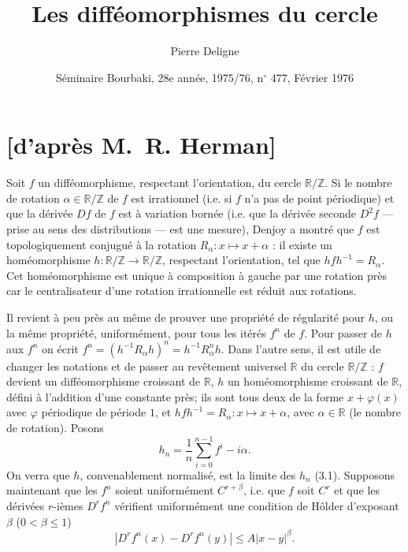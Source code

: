 \documentclass[12pt]{amsart}
\title{Les diff\'{e}omorphismes du cercle}
\author{Pierre Deligne}
\date{S\'{e}minaire Bourbaki, 28e ann\'{e}e, 1975/76, n$^{\circ}$ 477, F\'{e}vrier 1976}
\theoremstyle{plain}
\theoremstyle{remark}
\begin{document}
\maketitle

\section*{[d'apr\`{e}s M.~R. Herman]}

Soit $f$ un diff\'{e}omorphisme, respectant l'orientation, du cercle $\mathbb{R}/\mathbb{Z}$.
Si le nombre de rotation $\alpha \in \mathbb{R}/\mathbb{Z}$ de $f$ est irrationnel (i.e. si $f$ n'a pas de point p\'{e}riodique) et que la d\'{e}riv\'{e}e $Df$ de $f$ est \`{a} variation born\'{e}e (i.e. que la d\'{e}riv\'{e}e seconde $D^{2}f$ --- prise au sens des distributions --- est une mesure), Denjoy a montr\'{e} que $f$ est topologiquement conjugu\'{e} \`{a} la rotation $R_{\alpha} : x \mapsto x + \alpha$ : il existe un hom\'{e}omorphisme $h : \mathbb{R}/\mathbb{Z} \to \mathbb{R}/\mathbb{Z}$, respectant l'orientation, tel que $hfh^{-1} = R_{\alpha}$. Cet hom\'{e}omorphisme est unique \`{a} composition \`{a} gauche par une rotation pr\`{e}s car le centralisateur d'une rotation irrationnelle est r\'{e}duit aux rotations.

Il revient \`{a} peu pr\`{e}s au m\^{e}me de prouver une propri\'{e}t\'{e} de r\'{e}gularit\'{e} pour $h$, ou la m\^{e}me propri\'{e}t\'{e}, uniform\'{e}ment, pour tous les it\'{e}r\'{e}s $f^{n}$ de $f$. Pour passer de $h$ aux $f^{n}$ on \'{e}crit $f^{n} = (h^{-1}R_{\alpha}h)^{n} = h^{-1}R_{\alpha}^{n}h$. Dans l'autre sens, il est utile de changer les notations et de passer au rev\^{e}tement universel $\mathbb{R}$ du cercle $\mathbb{R}/\mathbb{Z}$ : $f$ devient un diff\'{e}omorphisme croissant de $\mathbb{R}$, $h$ un hom\'{e}omorphisme croissant de $\mathbb{R}$, d\'{e}fini \`{a} l'addition d'une constante pr\`{e}s; ils sont tous deux de la forme $x + \varphi(x)$ avec $\varphi$ p\'{e}riodique de p\'{e}riode $1$, et $hfh^{-1} = R_{\alpha} : x \mapsto x + \alpha$, avec $\alpha \in \mathbb{R}$ (le nombre de rotation). Posons
\[
h_{n} = \frac{1}{n} \sum_{i=0}^{n-1} f^{i} - i\alpha .
\]
On verra que $h$, convenablement normalis\'{e}, est la limite des $h_{n}$ (3.1). Supposons maintenant que les $f^{n}$ soient uniform\'{e}ment $C^{r+\beta}$, i.e. que $f$ soit $C^{r}$ et que les d\'{e}riv\'{e}es $r$-i\`{e}mes $D^{r}f^{n}$ v\'{e}rifient uniform\'{e}ment une condition de H\^{o}lder d'exposant $\beta$ ($0 < \beta \leq 1$)
\[
|D^{r}f^{n}(x) - D^{r}f^{n}(y)| \leq A|x-y|^{\beta} .
\]
\end{document}
